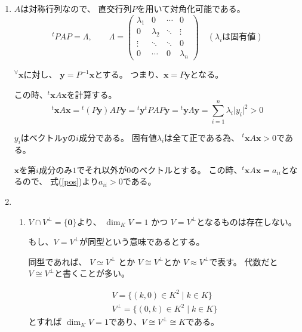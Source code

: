 \documentclass[12pt,b5paper]{ltjsarticle}
\begin{document}
\hrulefill


\begin{enumerate}
 \item
      $A$は対称行列なので、
      直交行列$P$を用いて対角化可能である。
      \begin{equation}
       {}^{t}PAP= \Lambda,
        \qquad
        \Lambda =
        \begin{pmatrix}
         \lambda_1 & 0 & \cdots & 0\\
         0 & \lambda_2 & \ddots & \vdots\\
         \vdots & \ddots & \ddots & 0\\
         0 & \cdots & 0 & \lambda_n
        \end{pmatrix}
       \quad (\lambda_i \text{は固有値})
      \end{equation}

      ${}^{\forall}\bm{x}$に対し、
      $\bm{y}=P^{-1}\bm{x}$とする。
      つまり、$\bm{x}=P\bm{y}$となる。

      この時、${}^{t}\bm{x}A\bm{x}$を計算する。
      \begin{equation}
       {}^{t}\bm{x}A\bm{x}
        = {}^{t}(P\bm{y})AP\bm{y}
        = {}^{t}\bm{y}{}^{t}PAP\bm{y}
        = {}^{t}\bm{y}\Lambda\bm{y}
        = \sum_{i=1}^{n}\lambda_i \lvert y_i \rvert^2
        > 0
        \label{pos}
      \end{equation}

      $y_i$はベクトル$\bm{y}$の$i$成分である。
      固有値$\lambda_i$は全て正である為、
      ${}^{t}\bm{x}A\bm{x}>0$である。

      $\bm{x}$を第$i$成分のみ$1$でそれ以外が$0$のベクトルとする。
      この時、${}^{t}\bm{x}A\bm{x}=a_{ii}$となるので、
      式(\ref{pos})より$a_{ii}>0$である。

 \item
      \begin{enumerate}
       \item
            $V \cap V^{\perp} = \{\bm{0}\}$より、
            $\dim_{K}V = 1$ かつ $V=V^{\perp}$となるものは存在しない。

            もし、$V=V^{\perp}$が同型という意味であるとする。

            同型であれば、
            $V \simeq V^{\perp}$ とか
            $V \cong V^{\perp}$とか
            $V \approx V^{\perp}$で表す。
            代数だと$V \cong V^{\perp}$と書くことが多い。

            \begin{align}
             V= \{ (k,0) \in K^2 \mid  k\in K\}\\
             V^{\perp} = \{ (0,k) \in K^2 \mid  k\in K\}
            \end{align}
            とすれば
            $\dim_{K} V = 1$であり、$V\cong V^{\perp} \cong K$である。


\end{enumerate}
\end{enumerate}
\end{document}
